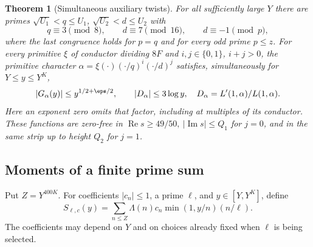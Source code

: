 \documentclass[a4paper,11pt]{article}
\newtheorem{theorem}[proposition]{Theorem}
\theoremstyle{definition}
\theoremstyle{remark}
\newcommand{\real}{\operatorname{Re}}\newcommand{\imag}{\operatorname{Im}}
\numberwithin{equation}{section}
\begin{document}
\begin{theorem}[Simultaneous auxiliary twists]\label{thm:twists}
For all sufficiently large \(Y\) there are primes \(\sqrt{U_1}<q\le U_1\), \(\sqrt{U_2}<d\le U_2\) with
\[
 q\equiv3\pmod8,\qquad d\equiv7\pmod{16},\qquad d\equiv-1\pmod p,
\]
where the last congruence holds for \(p=q\) and for every odd prime \(p\le z\).
For every primitive \(\xi\) of conductor dividing \(8F\) and \(i,j\in\{0,1\}\), \(i+j>0\), the primitive character
\(\alpha=\xi(\cdot)(\cdot/q)^i(\cdot/d)^j\) satisfies, simultaneously for \(Y\le y\le Y^K\),
\begin{equation}
 |G_\alpha(y)|\le y^{1/2+\eps/2},\qquad |D_\alpha|\le 3\log y,
 \quad D_\alpha=L'(1,\alpha)/L(1,\alpha).                         \label{eq:tw11}
\end{equation}
Here an exponent zero omits that factor, including at multiples of its conductor. These functions are zero-free in \(\real s\ge49/50,\ |\imag s|\le Q_1\) for \(j=0\), and in the same strip up to height \(Q_2\) for \(j=1\).
\end{theorem}

\subsection{Moments of a finite prime sum}\label{nav:I-17}
Put \(Z=Y^{400K}\). For coefficients \(|c_n|\le1\), a prime \(\ell\), and \(y\in[Y,Y^K]\), define
\[
 S_{\ell,c}(y)=\sum_{n\le Z}\Lambda(n)c_n\min(1,y/n)(n/\ell).
\]
The coefficients may depend on \(Y\) and on choices already fixed when \(\ell\) is being selected.
\end{document}
